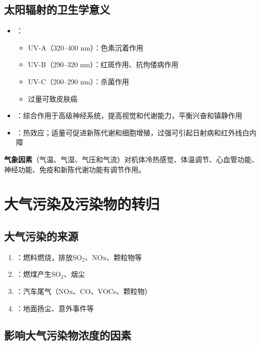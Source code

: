 \documentclass[10pt,a4paper,oneside]{ctexbook}
\begin{document}
\subsection{太阳辐射的卫生学意义}
\begin{itemize}[leftmargin=*]
    \item {}：
    \begin{itemize}
        \item UV-A（320--400 nm）：色素沉着作用
        \item UV-B（290--320 nm）：红斑作用、抗佝偻病作用
        \item UV-C（200--290 nm）：杀菌作用
        \item 过量可致皮肤癌
    \end{itemize}
    \item {}：综合作用于高级神经系统，提高视觉和代谢能力，平衡兴奋和镇静作用
    \item {}：热效应；适量可促进新陈代谢和细胞增殖，过强可引起日射病和红外线白内障
\end{itemize}

\textbf{气象因素}（气温、气湿、气压和气流）对机体冷热感觉、体温调节、心血管功能、神经功能、免疫和新陈代谢功能有调节作用。

\section{大气污染及污染物的转归}

\subsection{大气污染的来源}

\begin{enumerate}[leftmargin=*]
    \item {}：燃料燃烧，排放SO$_2$、NOx、颗粒物等
    \item {}：燃煤产生SO$_2$、烟尘
    \item {}：汽车尾气（NOx、CO、VOCs、颗粒物）
    \item {}：地面扬尘、意外事件等
\end{enumerate}

\subsection{影响大气污染物浓度的因素}
\end{document}

